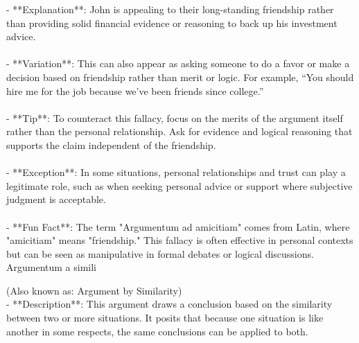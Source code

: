 \documentclass[a4paper,12pt,single,pdftex]{scrartcl}
\begin{document}
    
        - **Explanation**: John is appealing to their long-standing friendship rather than providing solid financial evidence or reasoning to back up his investment advice.
    \\

    
      
    \\

    
      - **Variation**: This can also appear as asking someone to do a favor or make a decision based on friendship rather than merit or logic. For example, “You should hire me for the job because we’ve been friends since college.”
    \\

    
      
    \\

    
      - **Tip**: To counteract this fallacy, focus on the merits of the argument itself rather than the personal relationship. Ask for evidence and logical reasoning that supports the claim independent of the friendship.
    \\

    
      
    \\

    
      - **Exception**: In some situations, personal relationships and trust can play a legitimate role, such as when seeking personal advice or support where subjective judgment is acceptable.
    \\

    
      
    \\

    
      - **Fun Fact**: The term "Argumentum ad amicitiam" comes from Latin, where "amicitiam" means "friendship." This fallacy is often effective in personal contexts but can be seen as manipulative in formal debates or logical discussions.
    \\

  

Argumentum a simili
    
      (Also known as: Argument by Similarity)
    \\

  
    
      - **Description**: This argument draws a conclusion based on the similarity between two or more situations. It posits that because one situation is like another in some respects, the same conclusions can be applied to both.
    \\
\end{document}
